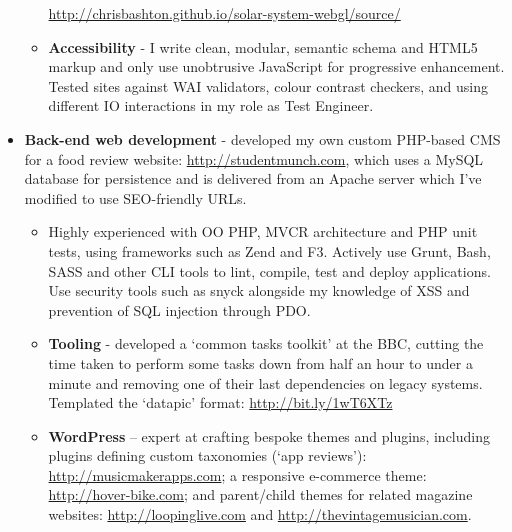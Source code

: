\documentclass[class=article, crop=false]{standalone}
\begin{document}
\begin{itemize}
\begin{itemize}
        \url{http://chrisbashton.github.io/solar-system-webgl/source/}

        \item \textbf{Accessibility} - I write clean, modular, semantic schema and HTML5 markup and only use unobtrusive JavaScript for progressive enhancement. Tested sites against WAI validators, colour contrast checkers, and using different IO interactions in my role as Test Engineer.

    \end{itemize}

    \item \textbf{Back-end web development} - developed my own custom PHP-based CMS for a food review website: \url{http://studentmunch.com}, which uses a MySQL database for persistence and is delivered from an Apache server which I've modified to use SEO-friendly URLs.

    \begin{itemize}
        \setlength\itemsep{0.3em}

        \item Highly experienced with OO PHP, MVCR architecture and PHP unit tests, using frameworks such as Zend and F3. Actively use Grunt, Bash, SASS and other CLI tools to lint, compile, test and deploy applications. Use security tools such as snyck alongside my knowledge of XSS and prevention of SQL injection through PDO.

        \item \textbf{Tooling} - developed a ‘common tasks toolkit’ at the BBC, cutting the time taken to perform some tasks down from half an hour to under a minute and removing one of their last dependencies on legacy systems. Templated the ‘datapic’ format: \url{http://bit.ly/1wT6XTz}

        \item \textbf{WordPress} – expert at crafting bespoke themes and plugins, including plugins defining custom taxonomies (`app reviews'): \url{http://musicmakerapps.com}; a responsive e-commerce theme: \url{http://hover-bike.com}; and parent/child themes for related magazine websites: \url{http://loopinglive.com} and
        \url{http://thevintagemusician.com}.

    \end{itemize}

\end{itemize}
\end{document}
